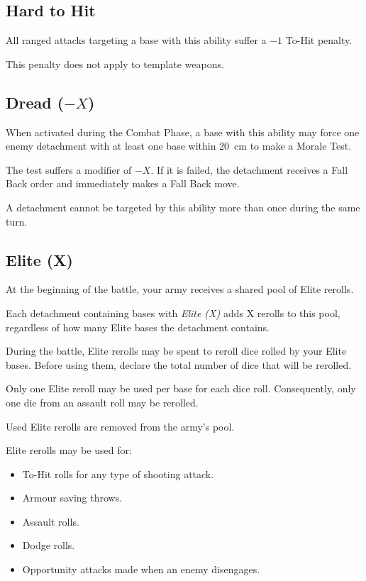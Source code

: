 \subsection{Hard to Hit}

All ranged attacks targeting a base with this ability suffer a $-1$ To-Hit penalty.

This penalty does not apply to template weapons.

\subsection{Dread ($-X$)}

When activated during the Combat Phase, a base with this ability may force one enemy detachment with at least one base within 20~cm to make a Morale Test.

The test suffers a modifier of $-X$. If it is failed, the detachment receives a Fall Back order and immediately makes a Fall Back move.

A detachment cannot be targeted by this ability more than once during the same turn.

\subsection{Elite (X)}

At the beginning of the battle, your army receives a shared pool of Elite rerolls.

Each detachment containing bases with \textit{Elite (X)} adds X rerolls to this pool, regardless of how many Elite bases the detachment contains.

During the battle, Elite rerolls may be spent to reroll dice rolled by your Elite bases. Before using them, declare the total number of dice that will be rerolled.

Only one Elite reroll may be used per base for each dice roll. Consequently, only one die from an assault roll may be rerolled.

Used Elite rerolls are removed from the army's pool.

Elite rerolls may be used for:

\begin{itemize}
    \item To-Hit rolls for any type of shooting attack.
    \item Armour saving throws.
    \item Assault rolls.
    \item Dodge rolls.
    \item Opportunity attacks made when an enemy disengages.
\end{itemize}

